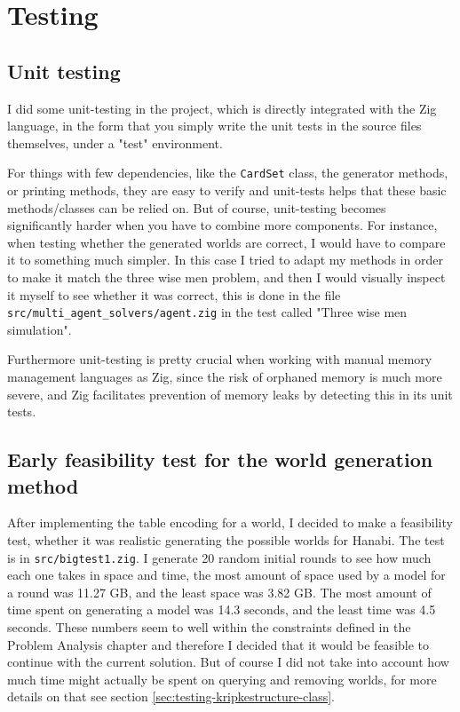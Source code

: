 \section{Testing}
\subsection{Unit testing}
I did some unit-testing in the project, which is directly integrated with the Zig language, in the form that you simply write the unit tests in the source files themselves, under a "test" environment. 

For things with few dependencies, like the {\tt CardSet} class, the generator methods, or printing methods, they are easy to verify and unit-tests helps that these basic methods/classes can be relied on. But of course, unit-testing becomes significantly harder when you have to combine more components. For instance, when testing whether the generated worlds are correct, I would have to compare it to something much simpler. In this case I tried to adapt my methods in order to make it match the three wise men problem, and then I would visually inspect it myself to see whether it was correct, this is done in the file {\tt src/multi\_agent\_solvers/agent.zig} in the test called "Three wise men simulation".

Furthermore unit-testing is pretty crucial when working with manual memory management languages as Zig, since the risk of orphaned memory is much more severe, and Zig facilitates prevention of memory leaks by detecting this in its unit tests. 


\subsection{Early feasibility test for the world generation method}
After implementing the table encoding for a world, I decided to make a feasibility test, whether it was realistic generating the possible worlds for Hanabi. The test is in {\tt src/bigtest1.zig}. I generate 20 random initial rounds to see how much each one takes in space and time, the most amount of space used by a model for a round was 11.27 GB, and the least space was 3.82 GB. The most amount of time spent on generating a model was 14.3 seconds, and the least time was 4.5 seconds.
These numbers seem to well within the constraints defined in the Problem Analysis chapter and therefore I decided that it would be feasible to continue with the current solution. But of course I did not take into account how much time might actually be spent on querying and removing worlds, for more details on that see section \ref{sec:testing-kripkestructure-class}.

